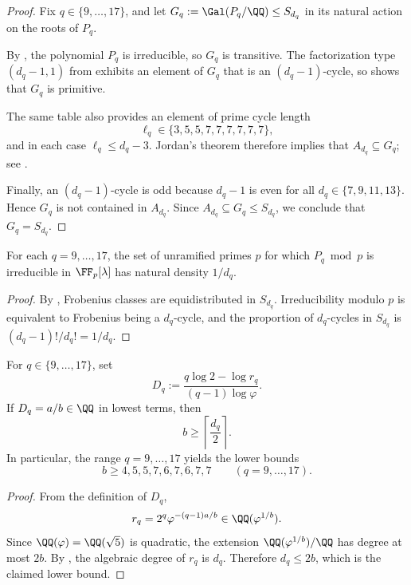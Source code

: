 \begin{proof}
Fix \(q\in\{9,\dots,17\}\), and let \(G_q:=\Gal(P_q/\QQ)\le S_{d_q}\) in its
natural action on the roots of \(P_q\).

By , the polynomial \(P_q\) is irreducible, so
\(G_q\) is transitive.  The factorization type \((d_q-1,1)\) from
 exhibits an element of \(G_q\) that is an
\((d_q-1)\)-cycle, so  shows that \(G_q\) is
primitive.

The same table also provides an element of prime cycle length
\[
  \ell_q\in\{3,5,5,7,7,7,7,7,7\},
\]
and in each case \(\ell_q\le d_q-3\).  Jordan's theorem therefore implies that
\(A_{d_q}\subseteq G_q\); see \cite[Thm.~3.3A]{DixonMortimer1996}.

Finally, an \((d_q-1)\)-cycle is odd because \(d_q-1\) is even for all
\(d_q\in\{7,9,11,13\}\).  Hence \(G_q\) is not contained in \(A_{d_q}\).  Since
\(A_{d_q}\subseteq G_q\le S_{d_q}\), we conclude that \(G_q=S_{d_q}\).
\end{proof}

\begin{corollary}
\label{cor:individual-chebotarev}
For each \(q=9,\dots,17\), the set of unramified primes \(p\) for which
\(P_q\bmod p\) is irreducible in \(\FF_p[\lambda]\) has natural density
\(1/d_q\).
\end{corollary}

\begin{proof}
By , Frobenius classes are equidistributed in
\(S_{d_q}\).  Irreducibility modulo \(p\) is equivalent to Frobenius being a
\(d_q\)-cycle, and the proportion of \(d_q\)-cycles in \(S_{d_q}\) is
\((d_q-1)!/d_q!=1/d_q\).
\end{proof}

\begin{corollary}
\label{cor:renyi-rational-denominator}
For \(q\in\{9,\dots,17\}\), set
\[
  D_q:=\frac{q\log 2-\log r_q}{(q-1)\log\varphi}.
\]
If \(D_q=a/b\in\QQ\) in lowest terms, then
\[
  b\ge \left\lceil\frac{d_q}{2}\right\rceil.
\]
In particular, the range \(q=9,\dots,17\) yields the lower bounds
\[
  b\ge 4,5,5,7,6,7,6,7,7
  \qquad (q=9,\dots,17).
\]
\end{corollary}

\begin{proof}
From the definition of \(D_q\),
\[
  r_q = 2^q\varphi^{-(q-1)a/b}\in \QQ(\varphi^{1/b}).
\]
Since \(\QQ(\varphi)=\QQ(\sqrt5)\) is quadratic, the extension
\(\QQ(\varphi^{1/b})/\QQ\) has degree at most \(2b\).  By
, the algebraic degree of \(r_q\) is \(d_q\).
Therefore \(d_q\le 2b\), which is the claimed lower bound.
\end{proof}

